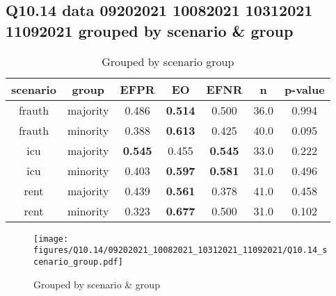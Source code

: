 \subsection{Q10.14 data 09202021 10082021 10312021 11092021 grouped by scenario \& group}

\begin{comment}
                        EFPR        EO      EFNR     n    pvalue
(frauth, majority)  0.486111  0.513889  0.500000  36.0  0.993530
(frauth, minority)  0.387500  0.612500  0.425000  40.0  0.095109
(icu, majority)     0.545455  0.454545  0.545455  33.0  0.222079
(icu, minority)     0.403226  0.596774  0.580645  31.0  0.495848
(rent, majority)    0.439024  0.560976  0.378049  41.0  0.457924
(rent, minority)    0.322581  0.677419  0.500000  31.0  0.102470
\end{comment}

\begin{table}[h]
    \centering
    \begin{tabular}{|c|c|c|c|c|c|c|}
        \hline
        scenario & group & EFPR & EO & EFNR & n & p-value\\
        \hline
        frauth & majority & 0.486 & \textbf{0.514} & 0.500 & 36.0 & 0.994\\
		frauth & minority & 0.388 & \textbf{0.613} & 0.425 & 40.0 & 0.095\\
		icu & majority & \textbf{0.545} & 0.455 & \textbf{0.545} & 33.0 & 0.222\\
		icu & minority & 0.403 & \textbf{0.597} & \textbf{0.581} & 31.0 & 0.496\\
		rent & majority & 0.439 & \textbf{0.561} & 0.378 & 41.0 & 0.458\\
		rent & minority & 0.323 & \textbf{0.677} & 0.500 & 31.0 & 0.102\\
		
        \hline
    \end{tabular}
    \caption{Grouped by scenario group}
    \label{tab:my_label}
\end{table}
\begin{figure}[h]
    \centering
    \texttt{[image: figures/Q10.14/09202021\_10082021\_10312021\_11092021/Q10.14\_scenario\_group.pdf]}
    \caption{Grouped by scenario \& group}
    \label{fig:my_label}
\end{figure}
